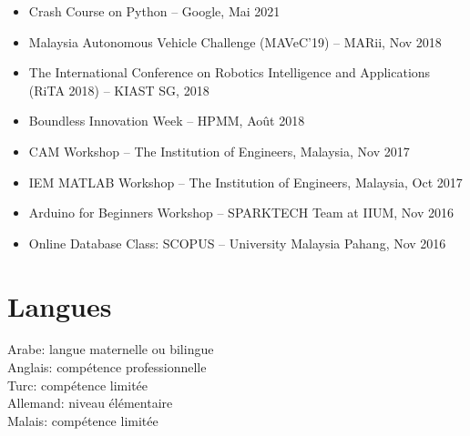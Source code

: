 \documentclass[11pt,a4paper]{article}
\begin{document}
\begin{itemize}
    \item Crash Course on Python -- Google, Mai 2021
    \item Malaysia Autonomous Vehicle Challenge (MAVeC'19) -- MARii, Nov 2018
    \item The International Conference on Robotics Intelligence and Applications (RiTA 2018) -- KIAST SG, 2018
    \item Boundless Innovation Week -- HPMM, Août 2018
    \item CAM Workshop -- The Institution of Engineers, Malaysia, Nov 2017
    \item IEM MATLAB Workshop -- The Institution of Engineers, Malaysia, Oct 2017
    \item Arduino for Beginners Workshop -- SPARKTECH Team at IIUM, Nov 2016
    \item Online Database Class: SCOPUS -- University Malaysia Pahang, Nov 2016
\end{itemize}

\section*{Langues}

Arabe: langue maternelle ou bilingue\\
Anglais: compétence professionnelle\\
Turc: compétence limitée\\
Allemand: niveau élémentaire\\
Malais: compétence limitée
\end{document}
